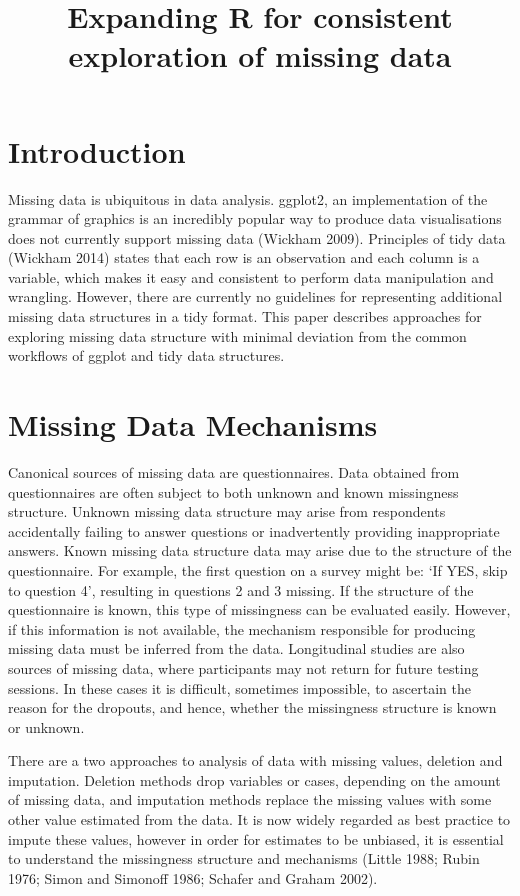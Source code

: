 \documentclass[]{article}
\title{Expanding R for consistent exploration of missing data}
\author{}
\date{}
\begin{document}
\maketitle

\section{Introduction}\label{introduction}

Missing data is ubiquitous in data analysis. ggplot2, an implementation
of the grammar of graphics is an incredibly popular way to produce data
visualisations does not currently support missing data (Wickham 2009).
Principles of tidy data (Wickham 2014) states that each row is an
observation and each column is a variable, which makes it easy and
consistent to perform data manipulation and wrangling. However, there
are currently no guidelines for representing additional missing data
structures in a tidy format. This paper describes approaches for
exploring missing data structure with minimal deviation from the common
workflows of ggplot and tidy data structures.

\section{Missing Data Mechanisms}\label{missing-data-mechanisms}

Canonical sources of missing data are questionnaires. Data obtained from
questionnaires are often subject to both unknown and known missingness
structure. Unknown missing data structure may arise from respondents
accidentally failing to answer questions or inadvertently providing
inappropriate answers. Known missing data structure data may arise due
to the structure of the questionnaire. For example, the first question
on a survey might be: `If YES, skip to question 4', resulting in
questions 2 and 3 missing. If the structure of the questionnaire is
known, this type of missingness can be evaluated easily. However, if
this information is not available, the mechanism responsible for
producing missing data must be inferred from the data. Longitudinal
studies are also sources of missing data, where participants may not
return for future testing sessions. In these cases it is difficult,
sometimes impossible, to ascertain the reason for the dropouts, and
hence, whether the missingness structure is known or unknown.

There are a two approaches to analysis of data with missing values,
deletion and imputation. Deletion methods drop variables or cases,
depending on the amount of missing data, and imputation methods replace
the missing values with some other value estimated from the data. It is
now widely regarded as best practice to impute these values, however in
order for estimates to be unbiased, it is essential to understand the
missingness structure and mechanisms (Little 1988; Rubin 1976; Simon and
Simonoff 1986; Schafer and Graham 2002).
\end{document}
